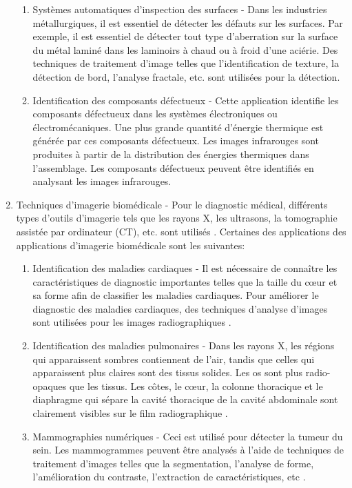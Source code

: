 \documentclass[12pt]{article}
\begin{document}
\begin{enumerate}
	\begin{enumerate}
		\item Systèmes automatiques d'inspection des surfaces - Dans les industries métallurgiques, il est essentiel de détecter les défauts sur les surfaces. Par exemple, il est essentiel de détecter tout type d'aberration sur la surface du métal laminé dans les laminoirs à chaud ou à froid d'une aciérie. Des techniques de traitement d'image telles que l'identification de texture, la détection de bord, l'analyse fractale, etc. sont utilisées pour la détection.
		\item Identification des composants défectueux - Cette application identifie les composants défectueux dans les systèmes électroniques ou électromécaniques. Une plus grande quantité d'énergie thermique est générée par ces composants défectueux. Les images infrarouges sont produites à partir de la distribution des énergies thermiques dans l'assemblage. Les composants défectueux peuvent être identifiés en analysant les images infrarouges.
	\end{enumerate}
	\item Techniques d'imagerie biomédicale - Pour le diagnostic médical, différents types d'outils d'imagerie tels que les rayons X, les ultrasons, la tomographie assistée par ordinateur (CT), etc. sont utilisés \cite{19}. Certaines des applications des applications d'imagerie biomédicale sont les suivantes:
	\begin{enumerate}
		\item Identification des maladies cardiaques - Il est nécessaire de connaître les caractéristiques de diagnostic importantes telles que la taille du cœur et sa forme afin de classifier les maladies cardiaques. Pour améliorer le diagnostic des maladies cardiaques, des techniques d'analyse d'images sont utilisées pour les images radiographiques \cite{20} \cite{21}.
		\item Identification des maladies pulmonaires - Dans les rayons X, les régions qui apparaissent sombres contiennent de l'air, tandis que celles qui apparaissent plus claires sont des tissus solides. Les os sont plus radio-opaques que les tissus. Les côtes, le cœur, la colonne thoracique et le diaphragme qui sépare la cavité thoracique de la cavité abdominale sont clairement visibles sur le film radiographique \cite{22} \cite{23}.
		\item Mammographies numériques - Ceci est utilisé pour détecter la tumeur du sein. Les mammogrammes peuvent être analysés à l'aide de techniques de traitement d'images telles que la segmentation, l'analyse de forme, l'amélioration du contraste, l'extraction de caractéristiques, etc \cite{24}.
	\end{enumerate}
\end{enumerate}
\end{document}
